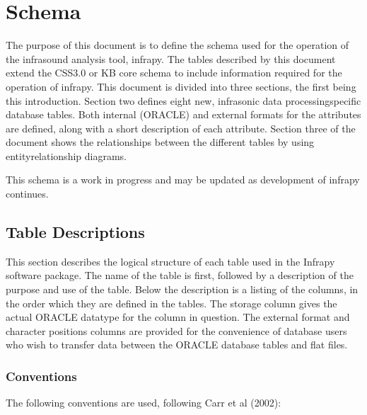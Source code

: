 \documentclass[letterpaper,10pt,english]{sphinxmanual}
\begin{document}
\section{Schema}
\label{\detokenize{schema:schema}}\label{\detokenize{schema:id1}}\label{\detokenize{schema::doc}}
The purpose of this document is to define the schema used for the
operation of the infrasound analysis tool, infrapy. The tables described
by this document extend the CSS3.0 or KB core schema to include
information required for the operation of infrapy. This document is
divided into three sections, the first being this introduction. Section
two defines eight new, infrasonic data processing\sphinxhyphen{}specific database
tables. Both internal (ORACLE) and external formats for the attributes
are defined, along with a short description of each attribute. Section
three of the document shows the relationships between the different
tables by using entity\sphinxhyphen{}relationship diagrams.

This schema is a work in progress and may be updated as development of
infrapy continues.


\subsection{Table Descriptions}
\label{\detokenize{schema:table-descriptions}}
This section describes the logical structure of each table used in the
Infrapy software package. The name of the table is first, followed by a
description of the purpose and use of the table. Below the description
is a listing of the columns, in the order which they are defined in the
tables. The storage column gives the actual ORACLE datatype for the
column in question. The external format and character positions columns
are provided for the convenience of database users who wish to transfer
data between the ORACLE database tables and flat files.


\subsubsection{Conventions}
\label{\detokenize{schema:conventions}}
The following conventions are used, following Carr et al (2002):
\end{document}
